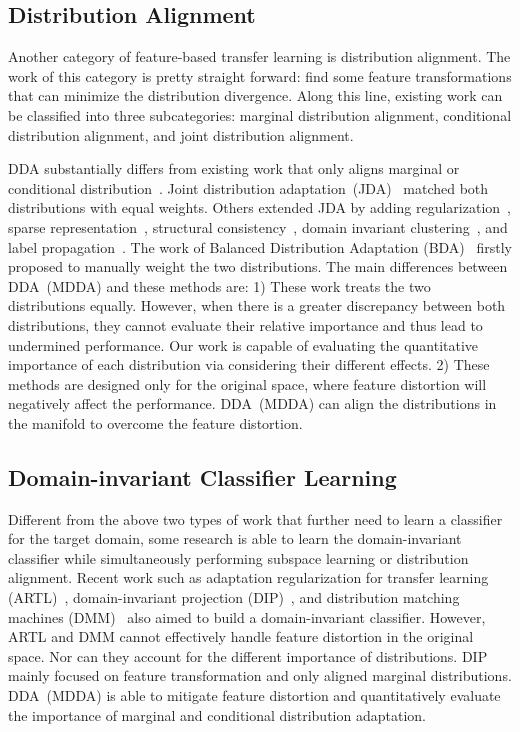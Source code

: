 \documentclass[acmsmall]{acmart}
\begin{document}
\subsection{Distribution Alignment}

Another category of feature-based transfer learning is distribution alignment. The work of this category is pretty straight forward: find some feature transformations that can minimize the distribution divergence. Along this line, existing work can be classified into three subcategories: marginal distribution alignment, conditional distribution alignment, and joint distribution alignment. 

DDA substantially differs from existing work that only aligns marginal or conditional distribution~\cite{pan2011domain}. Joint distribution adaptation~(JDA)~\cite{long2013transfer} matched both distributions with equal weights. Others extended JDA by adding regularization~\cite{long2014adaptation}, sparse representation~\cite{xu2016discriminative}, structural consistency~\cite{hou2016unsupervised}, domain invariant clustering~\cite{tahmoresnezhad2016visual}, and label propagation~\cite{zhang2017joint}. The work of Balanced Distribution Adaptation (BDA)~\cite{wang2017balanced} firstly proposed to manually weight the two distributions. The main differences between DDA~(MDDA) and these methods are: 1) These work treats the two distributions equally. However, when there is a greater discrepancy between both distributions, they cannot evaluate their relative importance and thus lead to undermined performance. Our work is capable of evaluating the quantitative importance of each distribution via considering their different effects. 2) These methods are designed only for the original space, where feature distortion will negatively affect the performance. DDA~(MDDA) can align the distributions in the manifold to overcome the feature distortion.

\subsection{Domain-invariant Classifier Learning}

Different from the above two types of work that further need to learn a classifier for the target domain, some research is able to learn the domain-invariant classifier while simultaneously performing subspace learning or distribution alignment. Recent work such as adaptation regularization for transfer learning (ARTL)~\cite{long2014adaptation}, domain-invariant projection (DIP)~\cite{baktashmotlagh2013unsupervised,baktashmotlagh2016distribution}, and distribution matching machines (DMM)~\cite{cao2018unsupervised} also aimed to build a domain-invariant classifier. However, ARTL and DMM cannot effectively handle feature distortion in the original space. Nor can they account for the different importance of distributions. DIP mainly focused on feature transformation and only aligned marginal distributions. DDA~(MDDA) is able to mitigate feature distortion and quantitatively evaluate the importance of marginal and conditional distribution adaptation.
\end{document}
